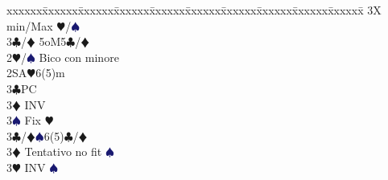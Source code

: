 \documentclass[a4paper,italian]{article}
\newcommand{\BC}{\textcolor{OliveGreen}{$\clubsuit$}}
\newcommand{\BD}{\textcolor{RedOrange}{$\vardiamondsuit$}}
\newcommand{\BH}{\textcolor{Red2}{$\varheartsuit${}}}
\newcommand{\BS}{\textcolor{MidnightBlue}{$\spadesuit${}}}
\newenvironment{bidtable}
{\begin{tabbing}

    xxxxxx\=xxxxxx\=xxxxxx\=xxxxxx\=xxxxxx\=xxxxxx\=xxxxxx\=xxxxxx\=xxxxxx\=xxxxxx\=\kill}
{\end{tabbing} }%
\begin{document}
\begin{multicols}{2}
\begin{bidtable}
                                                    3X\> min/Max \BH/\BS\-\\
                                                3\BC/\BD\> 5oM5\BC/\BD\-\\
                                            2\BH/\BS\> Bico con minore\\
                                            2SA\BH6(5)m\+\\
                                            3\BC\>PC\\
                                            3\BD\> INV\\
                                            3\BS\> Fix \BH\-\\
                                            3\BC/\BD{}\BS6(5)\BC/\BD\+\\
                                            3\BD\> Tentativo no fit \BS\\
                                            3\BH\> INV \BS\\
                                        \end{bidtable}
                                        \vspace{-.3cm}

\end{multicols}
\end{document}
